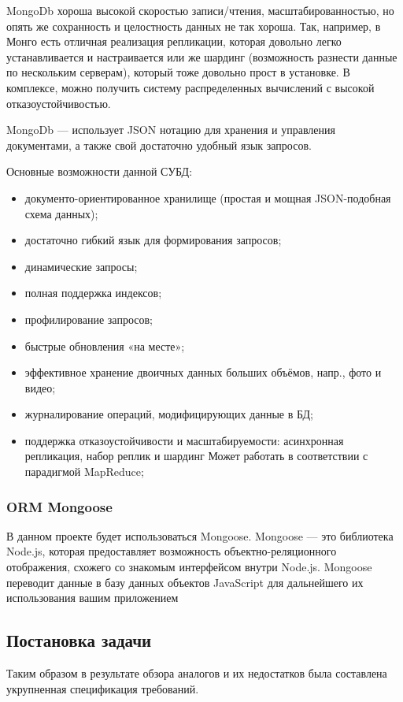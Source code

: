 MongoDb хороша высокой скоростью записи/чтения, масштабированностью, но опять же сохранность и целостность данных не так хороша. Так, например, в Монго есть отличная реализация репликации, которая довольно легко устанавливается и настраивается или же шардинг (возможность разнести данные по нескольким серверам), который тоже довольно прост в установке. В комплексе, можно получить систему распределенных вычислений с высокой отказоустойчивостью.

MongoDb — использует JSON нотацию для хранения и управления документами, а также свой достаточно удобный язык запросов.

Основные возможности данной СУБД:
\begin{itemize}
  \item документо-ориентированное хранилище (простая и мощная JSON-подобная схема данных);
  \item достаточно гибкий язык для формирования запросов;
  \item динамические запросы;
  \item полная поддержка индексов;
  \item профилирование запросов;
  \item быстрые обновления «на месте»;
  \item эффективное хранение двоичных данных больших объёмов, напр., фото и видео;
  \item журналирование операций, модифицирующих данные в БД;
  \item поддержка отказоустойчивости и масштабируемости: асинхронная репликация, набор реплик и шардинг
Может работать в соответствии с парадигмой MapReduce;
\end{itemize}

\subsubsection{ORM Mongoose }

 В данном проекте будет использоваться Mongoose.
Mongoose — это библиотека Node.js, которая предоставляет возможность объектно-реляционного отображения, схожего со знакомым интерфейсом внутри Node.js. Mongoose переводит данные в базу данных объектов JavaScript для дальнейшего их использования вашим приложением


\subsection{Постановка задачи } %
\label{sub:domain:existing_tasked}
Таким образом в результате обзора аналогов и их недостатков была составлена укрупненная спецификация требований.

